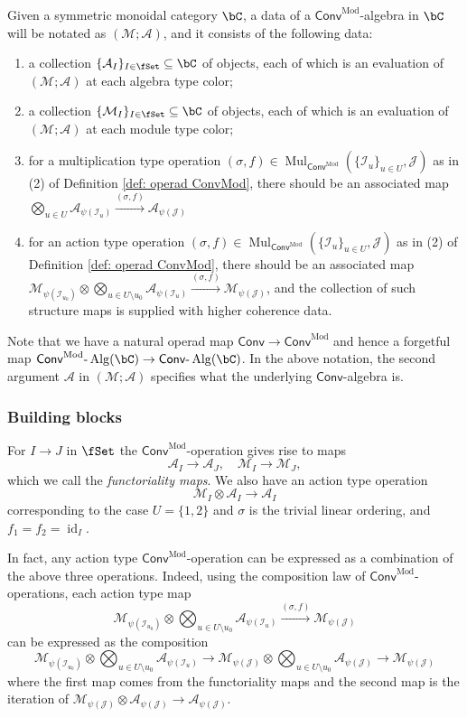 \documentclass[10pt]{amsart}
\newcommand{\sssec}{\subsubsection}
\theoremstyle{remark}
\newcommand{\on}{\operatorname}
\newcommand{\cA}{\mathcal{A}}
\newcommand{\cI}{\mathcal{I}}
\newcommand{\cM}{\mathcal{M}}
\newcommand{\cJ}{\mathcal{J}}
\newcommand{\lAlg}{\text{-}\on{Alg}}
\newcommand{\id}{\on{id}}
\newcommand{\Mul}{\on{Mul}}
\newcommand{\Conv}{\mathsf{Conv}}
\newcommand{\ConvMod}{\mathsf{Conv}^{\on{Mod}}}
\begin{document}
\sssec{}\label{sssec: ConvMod algebra object}
Given a symmetric monoidal category $\bC$, a data of a $\ConvMod$-algebra in $\bC$ will be notated as $(\cM;\cA)$, and it consists of the following data: 
\begin{enumerate}
    \item a collection $\{\cA_I\}_{I\in\fSet}\subseteq \bC$ of objects, each of which is an evaluation of $(\cM;\cA)$ at each algebra type color;
    \item a collection $\{\cM_I\}_{I\in\fSet}\subseteq \bC$ of objects, each of which is an evaluation of $(\cM;\cA)$ at each module type color;
    \item for a multiplication type operation $(\sigma,f)\in \Mul_{\ConvMod}(\{\cI_u\}_{u\in U},\cJ)$ as in (2) of Definition \ref{def: operad ConvMod}, there should be an associated map $\bigotimes_{u\in U}\cA_{\psi(\cI_u)}\xrightarrow{(\sigma,f)}\cA_{\psi(\cJ)}$
    \item for an action type operation $(\sigma,f)\in \Mul_{\ConvMod}(\{\cI_u\}_{u\in U},\cJ)$ as in (2) of Definition \ref{def: operad ConvMod}, there should be an associated map $\cM_{\psi(\cI_{u_0})}\otimes\bigotimes_{u\in U\setminus u_0}\cA_{\psi(\cI_u)}\xrightarrow{(\sigma,f)}\cM_{\psi(\cJ)}$, and the collection of such structure maps is supplied with higher coherence data.
\end{enumerate}

Note that we have a natural operad map $\Conv\rightarrow\ConvMod$ and hence a forgetful map $\ConvMod\lAlg(\bC)\rightarrow \Conv\lAlg(\bC)$. In the above notation, the second argument $\cA$ in $(\cM;\cA)$ specifies what the underlying $\Conv$-algebra is.

\sssec{Building blocks}\label{sssec: building blocks}
For $I\rightarrow J$ in $\fSet$ the $\ConvMod$-operation gives rise to maps
\[\cA_I\rightarrow \cA_J,\quad \cM_I\rightarrow \cM_J,\]
which we call the \emph{functoriality maps}. We also have an action type operation \[\cM_I\otimes \cA_I\rightarrow \cA_I\] corresponding to the case $U=\{1,2\}$ and $\sigma$ is the trivial linear ordering, and $f_1=f_2=\id_I$.
    \medskip

    In fact, any action type $\ConvMod$-operation can be expressed as a combination of the above three operations. Indeed, using the composition  law of $\ConvMod$-operations, each action type map
\[\cM_{\psi(\cI_{u_0})}\otimes\bigotimes_{u\in U\setminus u_0}\cA_{\psi(\cI_u)}\xrightarrow{(\sigma,f)}\cM_{\psi(\cJ)}\]
can be expressed as the composition
\[\cM_{\psi(\cI_{u_0})}\otimes\bigotimes_{u\in U\setminus u_0}\cA_{\psi(\cI_u)}\rightarrow \cM_{\psi(\cJ)}\otimes\bigotimes_{u\in U\setminus u_0}\cA_{\psi(\cJ)}\rightarrow\cM_{\psi(\cJ)}\]
where the first map comes from the functoriality maps and the second map is the iteration of $\cM_{\psi(\cJ)}\otimes \cA_{\psi(\cJ)}\rightarrow \cA_{\psi(\cJ)}$.
\end{document}
